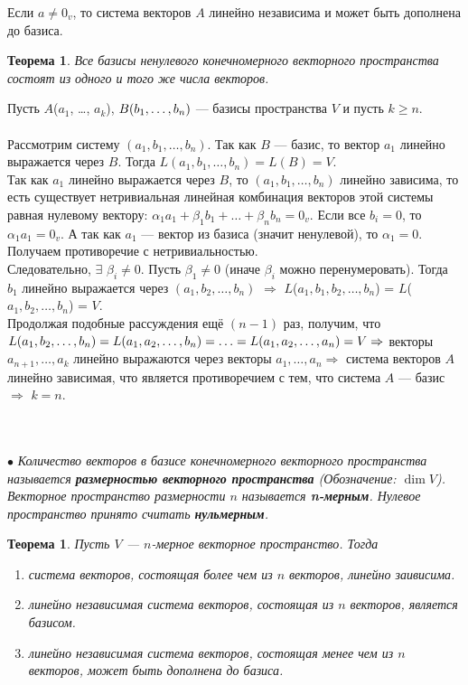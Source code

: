 \begin{Proof}
	Если $a \neq 0_v$, то система векторов $A$ линейно независима и может быть дополнена до базиса.
\end{Proof}
\newtheorem*{Th2*}{Теорема}\begin{Th2*} Все базисы ненулевого конечномерного векторного пространства состоят из одного и того же числа векторов. \end{Th2*}
\begin{Proof}
	Пусть $A$($a_1$, \dots, $a_k$), $B(b_1,\dots,b_n)$ --- базисы пространства $V$ и пусть $k\geqslant n$.\\\\
	Рассмотрим систему $(a_1, b_1, \dots, b_n)$. Так как $B$ --- базис, то вектор $a_1$ линейно выражается через $B$. Тогда $L(a_1, b_1, \dots, b_n) = L(B) = V$.\\
	Так как $a_1$ линейно выражается через $B$, то $(a_1, b_1, \dots, b_n)$ линейно зависима, то есть существует нетривиальная линейная комбинация векторов этой системы равная нулевому вектору: $\alpha_1a_1 + \beta_1b_1 + \ldots + \beta_n b_n = 0_v$. Если все $b_i = 0$, то $\alpha_1a_1 = 0_v$. А так как $a_1$ --- вектор из базиса (значит ненулевой), то $\alpha_1 = 0$. Получаем противоречие с нетривиальностью.\\
	Следовательно, $\exists$ $\beta_i \neq 0$. Пусть $\beta_1 \neq 0$ (иначе $\beta_i$ можно перенумеровать). Тогда $b_1$ линейно выражается через $(a_1,b_2,\dots, b_n)$ $\Rightarrow$ $L$($a_1, b_1, b_2, \dots, b_n$) = $L$($a_1, b_2, \dots, b_n$) = $V$.\\
	Продолжая подобные рассуждения ещё $(n-1)$ раз, получим, что $L(a_1, b_2, \dots, b_n) =\\ L(a_1, a_2, \dots, b_n) = \ldots = L(a_1, a_2, \dots, a_n) = V\Rightarrow$ векторы $a_{n+1}, \dots, a_k$ линейно выражаются через векторы $a_1, \dots, a_n \Rightarrow$ система векторов $A$ линейно зависимая, что является противоречием с тем, что система $A$ --- базис $\Rightarrow$ $k = n.$
\end{Proof}\\\\
$\bullet$ \textit{Количество векторов в базисе конечномерного векторного пространства называется \textbf{размерностью векторного пространства} (Обозначение: $\dim V$). Векторное пространство размерности $n$ называется \textbf{n-мерным}. Нулевое пространство принято считать \textbf{нульмерным}.}
\newtheorem*{Th4*}{Теорема}\begin{Th4*} Пусть $V$ --- $n$-мерное векторное пространство. Тогда\begin{enumerate}
		\item система векторов, состоящая более чем из $n$ векторов, линейно заивисима.
		\item линейно независимая система векторов, состоящая из $n$ векторов, является базисом.
		\item линейно независимая система векторов, состоящая менее чем из $n$ векторов, может быть дополнена до базиса.
\end{enumerate} \end{Th4*}
